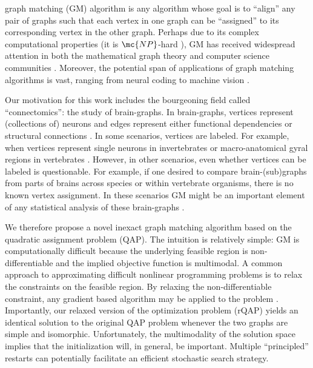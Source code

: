 \documentclass[10pt,journal,cspaper,compsoc]{IEEEtran}
\begin{document}
 graph matching (GM) algorithm is any algorithm whose goal is to ``align'' any pair of graphs such that each vertex in one graph can be ``assigned'' to its corresponding vertex in the other graph.  Perhaps due to its complex computational properties (it is $\mc{NP}$-hard \cite{Garey1979}), GM has received widespread attention in both the mathematical graph theory and computer science communities \cite{Conte2004}.  Moreover, the potential span of applications of graph matching algorithms is vast, ranging from neural coding \cite{Richiardi2010} to machine vision \cite{Wiskott1997}.  

Our motivation for this work includes the bourgeoning field called ``connectomics'': the study of brain-graphs.  In brain-graphs,  vertices represent (collections of) neurons and edges represent either functional dependencies or structural connections \cite{Sporns2010}.  In some scenarios, vertices are labeled.  For example, when vertices represent single neurons in invertebrates \cite{WhiteBrenner86} or macro-anatomical gyral regions in vertebrates \cite{Biswal2010,Bullmore2010}.  However, in other scenarios, even whether vertices can be labeled is questionable.  For example, if one desired to compare brain-(sub)graphs from parts of brains across species or within vertebrate organisms, there is no known vertex assignment.  In these scenarios GM might be an important element of any statistical analysis of these brain-graphs \cite{VP11_sigsub, VP11_unlabeled}.


We therefore propose a novel inexact graph matching algorithm based on the quadratic assignment problem (QAP).  The intuition is relatively simple: GM is computationally difficult because the underlying feasible region is non-differentiable and the implied objective function is multimodal.  A common approach to approximating difficult nonlinear programming problems is to relax the constraints on the feasible region.  By relaxing the non-differentiable constraint, any gradient based algorithm may be applied to the problem \cite{Mangasarian1987}. Importantly, our relaxed version of the optimization problem (rQAP) yields an identical solution to the original QAP problem whenever the two graphs are simple and isomorphic. Unfortunately, the multimodality of the solution space implies that the initialization will, in general, be important.  Multiple ``principled'' restarts can potentially facilitate an efficient stochastic search strategy.  
\end{document}
